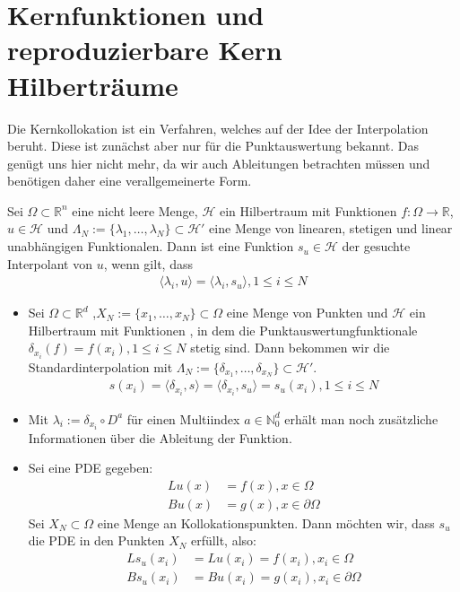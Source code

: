 \chapter{Kernfunktionen und reproduzierbare Kern Hilberträume}
\label{cha:Grundlagen}

Die Kernkollokation ist ein Verfahren, welches auf der Idee der Interpolation beruht. Diese ist zunächst aber nur für die Punktauswertung bekannt. Das genügt uns hier nicht mehr, da wir auch Ableitungen betrachten müssen und benötigen daher eine verallgemeinerte Form.

\begin{definition}
Sei $\Omega \subset \mathbb{R}^n$ eine nicht leere Menge, $\mathcal{H}$ ein Hilbertraum mit Funktionen $f:\Omega \rightarrow \mathbb{R}$, $u \in \mathcal{H}$  und $\Lambda_N := \{\lambda_1, \dots, \lambda_N\} \subset \mathcal{H}'$ eine Menge von linearen, stetigen und linear unabhängigen Funktionalen. Dann ist eine Funktion $s_u \in \mathcal{H}$ der gesuchte Interpolant von $u$, wenn gilt, dass
\begin{align*}
\langle \lambda_i,u \rangle = \langle \lambda_i,s_u \rangle , 1\le i \le N
\end{align*}
\end{definition}

\begin{example}
\begin{itemize}
\item
Sei $\Omega \subset \mathbb{R}^d$ ,$X_N := \{x_1, \dots, x_N\} \subset \Omega$ eine Menge von Punkten und $\mathcal{H}$ ein Hilbertraum mit Funktionen , in dem die Punktauswertungfunktionale $\delta_{x_i}(f) = f(x_i), 1\le i \le N$  stetig sind. Dann bekommen wir die Standardinterpolation mit $\Lambda_N := \{\delta_{x_1}, \dots,\delta_{x_N}\} \subset \mathcal{H}'$.
\begin{align*}
s(x_i) = \langle \delta_{x_i},s \rangle = \langle \delta_{x_i},s_u \rangle = s_u(x_i), 1\le i \le N
\end{align*}
\item
Mit $\lambda_i := \delta_{x_i} \circ D^a$ für einen Multiindex $a \in \mathbb{N}_0^d$ erhält man noch zusätzliche Informationen über die Ableitung der Funktion.
\item
Sei eine \ac{PDE} gegeben:
\begin{align*}
L u(x) &= f(x), x \in \Omega \\
B u(x) &= g(x), x \in \partial \Omega
\end{align*}
Sei $X_N \subset \Omega$ eine Menge an Kollokationspunkten. Dann möchten wir, dass $s_u$ die \ac{PDE} in den Punkten $X_N$ erfüllt, also:
\begin{align*}
L s_u(x_i) &= L u(x_i) = f(x_i), x_i \in \Omega \\
B s_u(x_i) &= B u(x_i) = g(x_i), x_i \in \partial \Omega
\end{align*}
\end{itemize}
\end{example}

